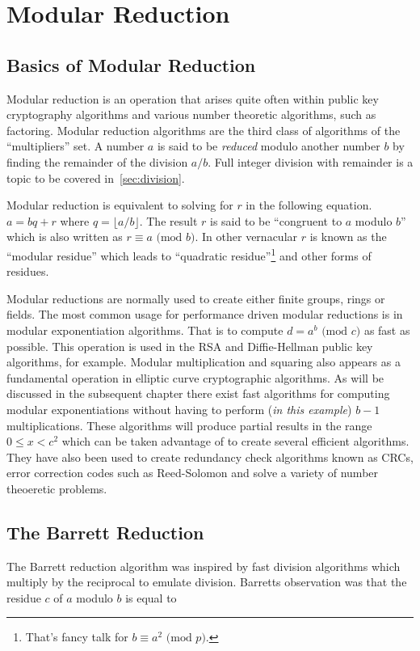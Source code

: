 \documentclass[b5paper]{book}
\begin{document}
\chapter{Modular Reduction}
\section{Basics of Modular Reduction}
Modular reduction is an operation that arises quite often within public key cryptography algorithms and various number theoretic algorithms, 
such as factoring.  Modular reduction algorithms are the third class of algorithms of the ``multipliers'' set.  A number $a$ is said to be \textit{reduced}
modulo another number $b$ by finding the remainder of the division $a/b$.  Full integer division with remainder is a topic to be covered 
in~\ref{sec:division}.

Modular reduction is equivalent to solving for $r$ in the following equation.  $a = bq + r$ where $q = \lfloor a/b \rfloor$.  The result 
$r$ is said to be ``congruent to $a$ modulo $b$'' which is also written as $r \equiv a \mbox{ (mod }b\mbox{)}$.  In other vernacular $r$ is known as the 
``modular residue'' which leads to ``quadratic residue''\footnote{That's fancy talk for $b \equiv a^2 \mbox{ (mod }p\mbox{)}$.} and
other forms of residues.  

Modular reductions are normally used to create either finite groups, rings or fields.  The most common usage for performance driven modular reductions 
is in modular exponentiation algorithms.  That is to compute $d = a^b \mbox{ (mod }c\mbox{)}$ as fast as possible.  This operation is used in the 
RSA and Diffie-Hellman public key algorithms, for example.  Modular multiplication and squaring also appears as a fundamental operation in 
elliptic curve cryptographic algorithms.  As will be discussed in the subsequent chapter there exist fast algorithms for computing modular 
exponentiations without having to perform (\textit{in this example}) $b - 1$ multiplications.  These algorithms will produce partial results in the 
range $0 \le x < c^2$ which can be taken advantage of to create several efficient algorithms.   They have also been used to create redundancy check 
algorithms known as CRCs, error correction codes such as Reed-Solomon and solve a variety of number theoeretic problems.  

\section{The Barrett Reduction}
The Barrett reduction algorithm \cite{BARRETT} was inspired by fast division algorithms which multiply by the reciprocal to emulate
division.  Barretts observation was that the residue $c$ of $a$ modulo $b$ is equal to 
\end{document}
